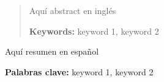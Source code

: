 \begin{abstract}
Aquí abstract en inglés
\bigskip

\textbf{Keywords:} keyword 1, keyword 2


\end{abstract}
\begin{resumen}
Aquí resumen en español
\bigskip

\textbf{Palabras clave:} keyword 1, keyword 2

\end{resumen}
